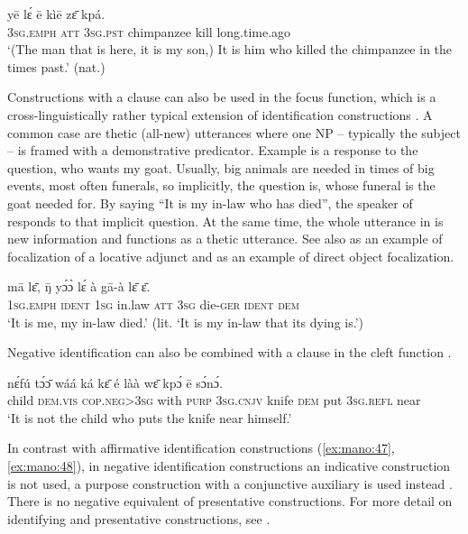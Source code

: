 \documentclass[output=paper,colorlinks,citecolor=brown]{langscibook}
\begin{document}
\ea\label{ex:mano:47}
    \gll yē lɛ́ ē kìē zɛ̄ kpá.\\
         \textsc{3sg.emph} \textsc{att} \textsc{3sg.pst} chimpanzee kill long.time.ago\\
    \glt ‘(The man that is here, it is my son,) It is him who killed the chimpanzee in the times past.’ (nat.)
\z

Constructions with a clause can also be used in the focus function, which is a cross-linguistically rather typical extension of identification constructions \citep{Killian2022}. A common case are thetic (all-new) utterances where one NP – typically the subject – is framed with a demonstrative predicator. Example  is a response to the question, who wants my goat. Usually, big animals are needed in times of big events, most often funerals, so implicitly, the question is, whose funeral is the goat needed for. By saying “It is my in-law who has died”, the speaker of  responds to that implicit question. At the same time, the whole utterance in  is new information and functions as a thetic utterance. See also  as an example of focalization of a locative adjunct and  as an example of direct object focalization.

\ea\label{ex:mano:48}
    \gll mā lɛ̄, ŋ̄ yɔ́ɔ̀ lɛ́ à gā-à lɛ̄ ɛ̄. \\
     \textsc{1sg.emph} \textsc{ident} \textsc{1sg} in.law \textsc{att} \textsc{3sg} die-\textsc{ger} \textsc{ident} \textsc{dem}\\
    \glt ‘It is me, my in-law died.’ (lit. ‘It is my in-law that its dying is.’)
\z

Negative identification can also be combined with a clause in the cleft function . 

\ea\label{ex:mano:49}
    \gll nɛ́fú tɔ́ɔ̄ wáá ká kɛ̄ é làà wɛ̄ kpɔ́ ē sɔ́nɔ́. \\
         child \textsc{dem.vis} \textsc{cop.neg>3sg} with \textsc{purp} \textsc{3sg.cnjv} knife \textsc{dem} put \textsc{3sg.refl} near\\
    \glt ‘It is not the child who puts the knife near himself.’
\z

In contrast with affirmative identification constructions (\ref{ex:mano:47}, \ref{ex:mano:48}), in negative identification constructions an indicative construction is not used, a purpose construction with a conjunctive auxiliary is used instead . There is no negative equivalent of presentative constructions. For more detail on identifying and presentative constructions, see \citet{KhachaturyanForthcoming}.
\end{document}
